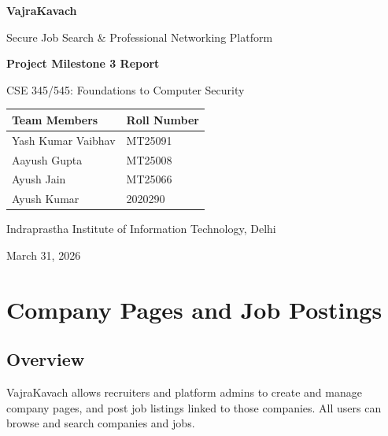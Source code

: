 \documentclass[12pt,a4paper]{article}
\begin{document}
\begin{titlepage}
\centering
\vspace*{2cm}
{\Huge\bfseries\color{primary} VajraKavach\par}
\vspace{0.5cm}
{\Large Secure Job Search \& Professional Networking Platform\par}
\vspace{2cm}
{\LARGE\bfseries Project Milestone 3 Report\par}
\vspace{0.3cm}
{\large CSE 345/545: Foundations to Computer Security\par}
\vspace{2cm}

\begin{tabular}{ll}
\toprule
\textbf{Team Members} & \textbf{Roll Number} \\
\midrule
Yash Kumar Vaibhav & MT25091 \\
Aayush Gupta & MT25008 \\
Ayush Jain & MT25066 \\
Ayush Kumar & 2020290 \\
\bottomrule
\end{tabular}

\vspace{2cm}
{\large Indraprastha Institute of Information Technology, Delhi\par}
\vspace{0.3cm}
{\large March 31, 2026\par}
\vfill
\end{titlepage}

\tableofcontents
\newpage

\section{Company Pages and Job Postings}

\subsection{Overview}
VajraKavach allows recruiters and platform admins to create and manage company pages, and post job listings linked to those companies. All users can browse and search companies and jobs.
\end{document}
